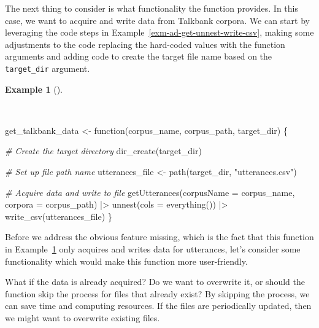 \documentclass[
  letterpaper,
]{latex/krantz}
\newenvironment{Shaded}{\begin{snugshade}}{\end{snugshade}}
\newcommand{\AttributeTok}[1]{\textcolor[rgb]{0.00,0.00,0.00}{#1}}
\newcommand{\CommentTok}[1]{\textcolor[rgb]{0.00,0.00,0.00}{\textit{#1}}}
\newcommand{\ControlFlowTok}[1]{\textcolor[rgb]{0.00,0.00,0.00}{#1}}
\newcommand{\FunctionTok}[1]{\textcolor[rgb]{0.00,0.00,0.00}{#1}}
\newcommand{\NormalTok}[1]{\textcolor[rgb]{0.00,0.00,0.00}{#1}}
\newcommand{\OtherTok}[1]{\textcolor[rgb]{0.00,0.00,0.00}{#1}}
\newcommand{\SpecialCharTok}[1]{\textcolor[rgb]{0.00,0.00,0.00}{#1}}
\newcommand{\StringTok}[1]{\textcolor[rgb]{0.00,0.00,0.00}{#1}}
\theoremstyle{definition}
\newtheorem{example}{Example}[chapter]
\theoremstyle{remark}
\begin{document}
The next thing to consider is what functionality the function provides.
In this case, we want to acquire and write data from Talkbank corpora.
We can start by leveraging the code steps in
Example~\ref{exm-ad-get-unnest-write-csv}, making some adjustments to
the code replacing the hard-coded values with the function arguments and
adding code to create the target file name based on the
\texttt{target\_dir} argument.

\begin{example}[]\protect\hypertarget{exm-ad-get-talkbank-data-2}{}\label{exm-ad-get-talkbank-data-2}

~

\begin{Shaded}
\begin{Highlighting}[]
\NormalTok{get\_talkbank\_data }\OtherTok{\textless{}{-}} \ControlFlowTok{function}\NormalTok{(corpus\_name, corpus\_path, target\_dir) \{}

  \CommentTok{\# Create the target directory}
  \FunctionTok{dir\_create}\NormalTok{(target\_dir)}

  \CommentTok{\# Set up file path name}
\NormalTok{  utterances\_file  }\OtherTok{\textless{}{-}} \FunctionTok{path}\NormalTok{(target\_dir, }\StringTok{"utterances.csv"}\NormalTok{)}

  \CommentTok{\# Acquire data and write to file}
  \FunctionTok{getUtterances}\NormalTok{(}\AttributeTok{corpusName =}\NormalTok{ corpus\_name, }\AttributeTok{corpora =}\NormalTok{ corpus\_path) }\SpecialCharTok{|\textgreater{}}
    \FunctionTok{unnest}\NormalTok{(}\AttributeTok{cols =} \FunctionTok{everything}\NormalTok{()) }\SpecialCharTok{|\textgreater{}}
    \FunctionTok{write\_csv}\NormalTok{(utterances\_file)}
\NormalTok{\}}
\end{Highlighting}
\end{Shaded}

\end{example}

Before we address the obvious feature missing, which is the fact that
this function in Example~\ref{exm-ad-get-talkbank-data-2} only acquires
and writes data for utterances, let's consider some functionality which
would make this function more user-friendly.

What if the data is already acquired? Do we want to overwrite it, or
should the function skip the process for files that already exist? By
skipping the process, we can save time and computing resources. If the
files are periodically updated, then we might want to overwrite existing
files.
\end{document}
